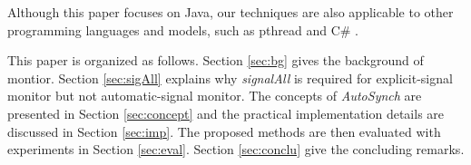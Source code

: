 \documentclass[preprint]{sigplanconf}
\begin{document}


Although this paper 
focuses on Java, our techniques are also applicable to other programming 
languages and models, such as pthread and C\# \cite{hwg03}.


This paper is organized as follows. Section \ref{sec:bg} gives the background
of montior. 
Section \ref{sec:sigAll} explains why {\em signalAll} is required for
explicit-signal monitor but not automatic-signal monitor. The concepts of 
{\em AutoSynch} are presented in Section \ref{sec:concept} and the practical 
implementation details are discussed in Section  \ref{sec:imp}. The proposed 
methods are then evaluated with experiments in Section \ref{sec:eval}.  
Section \ref{sec:conclu} give the concluding remarks.
\end{document}
